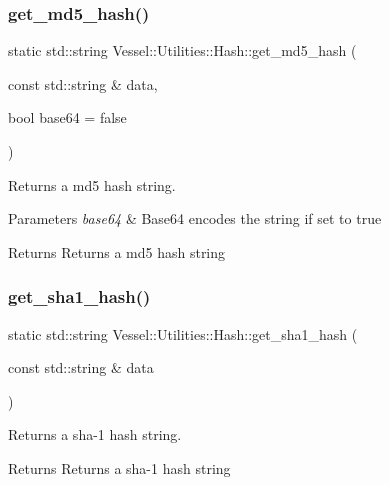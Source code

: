 \subsubsection{\texorpdfstring{get\+\_\+md5\+\_\+hash()}{get\_md5\_hash()}}
{\footnotesize\ttfamily static std\+::string Vessel\+::\+Utilities\+::\+Hash\+::get\+\_\+md5\+\_\+hash (\begin{DoxyParamCaption}\item[{const std\+::string \&}]{data,  }\item[{bool}]{base64 = {\ttfamily false} }\end{DoxyParamCaption})\hspace{0.3cm}{\ttfamily [static]}}



Returns a md5 hash string. 


\begin{DoxyParams}{Parameters}
{\em base64} & Base64 encodes the string if set to true \\
\hline
\end{DoxyParams}
\begin{DoxyReturn}{Returns}
Returns a md5 hash string 
\end{DoxyReturn}
\mbox{\label{class_vessel_1_1_utilities_1_1_hash_aac0daddfa7414c8e9ee27c1f4b811e6c}} 
\subsubsection{\texorpdfstring{get\+\_\+sha1\+\_\+hash()}{get\_sha1\_hash()}}
{\footnotesize\ttfamily static std\+::string Vessel\+::\+Utilities\+::\+Hash\+::get\+\_\+sha1\+\_\+hash (\begin{DoxyParamCaption}\item[{const std\+::string \&}]{data }\end{DoxyParamCaption})\hspace{0.3cm}{\ttfamily [static]}}



Returns a sha-\/1 hash string. 

\begin{DoxyReturn}{Returns}
Returns a sha-\/1 hash string 
\end{DoxyReturn}
\mbox{\label{class_vessel_1_1_utilities_1_1_hash_aae24b1d2642ec244551857894a13f533}} 
